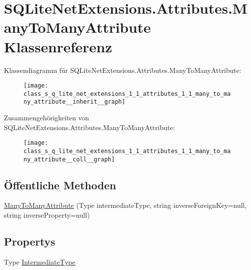 \hypertarget{class_s_q_lite_net_extensions_1_1_attributes_1_1_many_to_many_attribute}{}\section{S\+Q\+Lite\+Net\+Extensions.\+Attributes.\+Many\+To\+Many\+Attribute Klassenreferenz}
\label{class_s_q_lite_net_extensions_1_1_attributes_1_1_many_to_many_attribute}


Klassendiagramm für S\+Q\+Lite\+Net\+Extensions.\+Attributes.\+Many\+To\+Many\+Attribute\+:\nopagebreak
\begin{figure}[H]
\begin{center}
\leavevmode
\texttt{[image: class\_s\_q\_lite\_net\_extensions\_1\_1\_attributes\_1\_1\_many\_to\_many\_attribute\_\_inherit\_\_graph]}
\end{center}
\end{figure}


Zusammengehörigkeiten von S\+Q\+Lite\+Net\+Extensions.\+Attributes.\+Many\+To\+Many\+Attribute\+:\nopagebreak
\begin{figure}[H]
\begin{center}
\leavevmode
\texttt{[image: class\_s\_q\_lite\_net\_extensions\_1\_1\_attributes\_1\_1\_many\_to\_many\_attribute\_\_coll\_\_graph]}
\end{center}
\end{figure}
\subsection*{Öffentliche Methoden}
\begin{DoxyCompactItemize}
\item 
\mbox{\hyperlink{class_s_q_lite_net_extensions_1_1_attributes_1_1_many_to_many_attribute_a39df441ee696d1c0bafe428e2b17624b}{Many\+To\+Many\+Attribute}} (Type intermediate\+Type, string inverse\+Foreign\+Key=null, string inverse\+Property=null)
\end{DoxyCompactItemize}
\subsection*{Propertys}
\begin{DoxyCompactItemize}
\item 
Type \mbox{\hyperlink{class_s_q_lite_net_extensions_1_1_attributes_1_1_many_to_many_attribute_af7b3aa1a3521ecf61260f8ea2886a4e4}{Intermediate\+Type}}
\end{DoxyCompactItemize}
